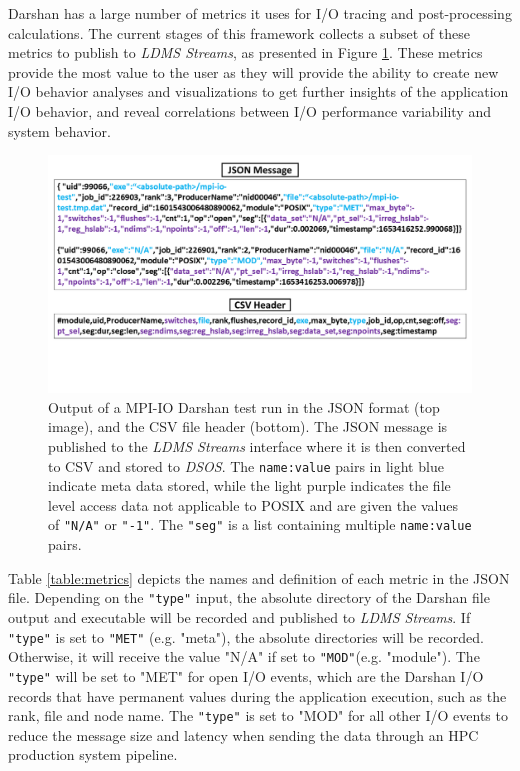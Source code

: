 Darshan has a large number of metrics it uses for I/O tracing and
post-processing calculations. The current stages of this framework
collects a subset of these metrics to publish to \emph{LDMS Streams},
as presented in Figure \ref{f:CSV Header and Output}. These metrics
provide the most value to the user as they will provide the ability to
create new I/O behavior analyses and visualizations to get further
insights of the application I/O behavior, and reveal correlations
between I/O performance variability and system behavior.
\begin{figure}
	\centering
	\includegraphics[trim={0 3cm 0 0},clip, width=1.01\linewidth]{figs/darshan-csv-json.pdf}
	\caption{Output of a MPI-IO Darshan test run in the JSON
          format (top image), and the CSV file header (bottom). The
          JSON message is published to the \emph{LDMS Streams}
          interface where it is then converted to CSV and stored to
          \emph{DSOS}. The \texttt{name:value} pairs in light blue
          indicate meta data stored, while the light purple indicates
          the file level access data not applicable to POSIX and
          are given the values of \texttt{"N/A"} or \texttt{"-1"}. The
          \texttt{"seg"} is a list containing multiple
          \texttt{name:value} pairs.}
	\label{f:CSV Header and Output}
\end{figure}
Table \ref{table:metrics} depicts the names and definition of each
metric in the JSON file. Depending on the \texttt{"type"} input, the
absolute directory of the Darshan file output and executable will be
recorded and published to \emph{LDMS Streams}. If \texttt{"type"} is
set to \texttt{"MET"} (e.g. "meta"), the absolute directories will be
recorded. Otherwise, it will receive the value "N/A" if set to
\texttt{"MOD"}(e.g. "module"). The \texttt{"type"} will be set to
"MET" for open I/O events, which are the Darshan I/O records that have
permanent values during the application execution, such as the rank,
file and node name. The \texttt{"type"} is set to "MOD" for all other
I/O events to reduce the message size and latency when sending the
data through an HPC production system pipeline.

